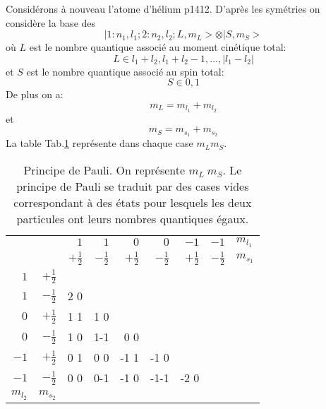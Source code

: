 \documentclass[12pt]{book}
\begin{document}
\begin{exmp}
Consid\'erons \`a nouveau l'atome d'h\'elium\cite{ph:mecaq:Cohen73} p1412.
D'apr\`es les sym\'etries on consid\`ere la base des
\begin{equation}
|1:n_1,l_1;2:n_2,l_2;L,m_L>\otimes|S,m_S>
\end{equation}
o\`u $L$ est le nombre quantique associ\'e au moment 
cin\'etique
total:
\begin{equation}
L\in{l_1+l_2,l_1+l_2-1, \dots,|l_1-l_2|}
\end{equation}
et $S$ est le nombre quantique associ\'e au spin
total:
\begin{equation}
S\in{0,1}
\end{equation}
De plus on a:
\begin{equation}
m_L=m_{l_1}+m_{l_2}
\end{equation}
et
\begin{equation}
m_S=m_{s_1}+m_{s_2}
\end{equation}
La table Tab.\ref{tabpauli} repr\'esente dans chaque case $m_Lm_S$.
\begin{table}[hbt]\label{tabpauli}
\caption{Principe de Pauli. On repr\'esente $m_L\:m_S$. Le principe
de Pauli se traduit par des cases vides correspondant \`a des \'etats
pour lesquels les deux particules ont leurs nombres quantiques \'egaux.}
\begin{center}
\begin{tabular}{|r|r|r|r|r|r|r|r|l|}
\cline{3-9}
\multicolumn{1}{c}{}& &$1$&$1$&$0$&$0$&$-1$&$-1$&$m_{l_1}$\\
\multicolumn{1}{c}{}& &$+\frac{1}{2}$&$-\frac{1}{2}$&$+\frac{1}{2}$&$-\frac{1}{2}$&$+\frac{1}{2}$&$-\frac{1}{2}$&$m_{s_1}$\\
\hline
$1$&$+\frac{1}{2}$&&&&&&&\multicolumn{1}{c}{}\\
\cline{1-8}
$1$&$-\frac{1}{2}$& 2  0&&&&&&\multicolumn{1}{c}{}\\
\cline{1-8}
$0$&$+\frac{1}{2}$& 1  1& 1  0&&&&&\multicolumn{1}{c}{}\\
\cline{1-8}
$0$&$-\frac{1}{2}$& 1  0& 1-1& 0  0&&&&\multicolumn{1}{c}{}\\
\cline{1-8}
$-1$&$+\frac{1}{2}$& 0  1& 0  0 &-1  1&-1  0&&&\multicolumn{1}{c}{}\\
\cline{1-8}
$-1$&$-\frac{1}{2}$& 0  0& 0-1&-1  0&-1-1&-2  0&&\multicolumn{1}{c}{}\\
\cline{1-8}
$m_{l_2}$&$m_{s_2}$&\multicolumn{7}{c}{}\\
\cline{1-2}
\end{tabular}

\end{center}
\end{table}
\end{exmp}
\end{document}
